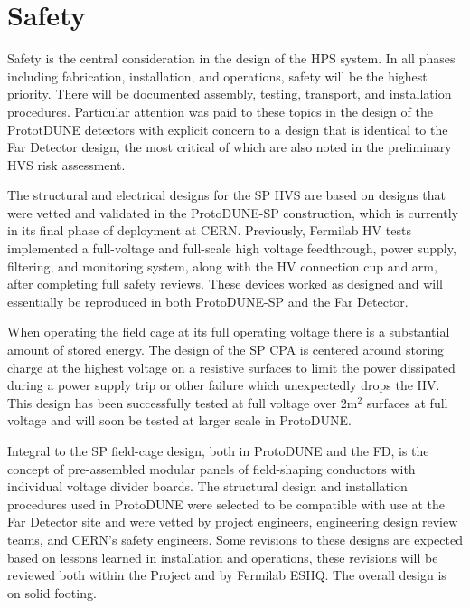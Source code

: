 \section{Safety}
\label{sec:fdsp-hv-safety}

Safety is the central consideration in the design of the HPS system. In all phases including fabrication, installation, and operations, safety will be the highest priority. There will be documented assembly, testing, transport, and installation procedures. Particular attention was paid to these topics in the design of the PrototDUNE detectors with explicit concern to a design that is identical to the Far Detector design, the most critical of which are also noted in the preliminary HVS risk assessment. 

The structural and electrical designs for the SP HVS are based on designs that were vetted and validated in the ProtoDUNE-SP construction, which is currently in its final phase of deployment at CERN. Previously, Fermilab HV tests implemented a full-voltage and full-scale high voltage feedthrough, power supply, filtering, and monitoring system, along with the HV connection cup and arm, after completing full safety reviews. These devices worked as designed and will essentially be reproduced in both ProtoDUNE-SP and the Far Detector. 

When operating the field cage at its full operating voltage there is a substantial amount of stored energy. The design of the SP CPA is centered around storing charge  at the highest voltage on a resistive surfaces to limit the power dissipated during a power supply trip or other failure which unexpectedly drops the HV. This design has been successfully tested at full voltage over 2m$^2$ surfaces at full voltage and will soon be tested at larger scale in ProtoDUNE.  

Integral to the SP field-cage design, both in ProtoDUNE and the FD, is the concept of pre-assembled modular panels of field-shaping conductors with individual voltage divider boards. The structural design and installation procedures used in ProtoDUNE were selected to be compatible with use at the Far Detector site and were vetted by project engineers, engineering design review teams, and CERN's safety engineers. Some revisions to these designs are expected based on lessons learned in installation and operations, these revisions will be reviewed both within the Project and by Fermilab ESHQ. The overall design is on solid footing. 

